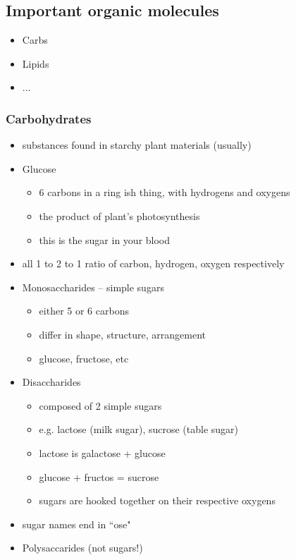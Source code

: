 \documentclass{article}
\theoremstyle{definition}
\begin{document}
\subsection{Important organic molecules}
\begin{itemize}
	\item Carbs
	\item Lipids
	\item ...
\end{itemize}

\subsubsection{Carbohydrates}
\begin{itemize}
	\item substances found in starchy plant materials (usually)
	\item Glucose
		\begin{itemize}
			\item 6 carbons in a ring ish thing, with hydrogens and oxygens
			\item the product of plant's photosynthesis
			\item this is the sugar in your blood
		\end{itemize}
	\item all 1 to 2 to 1 ratio of carbon, hydrogen, oxygen respectively
	\item Monosaccharides -- simple sugars
		\begin{itemize}
			\item either 5 or 6 carbons
			\item differ in shape, structure, arrangement
			\item glucose, fructose, etc
		\end{itemize}
	\item Disaccharides
		\begin{itemize}
			\item composed of 2 simple sugars
			\item e.g. lactose (milk sugar), sucrose (table sugar)
			\item lactose is galactose + glucose
			\item glucose + fructos = sucrose
			\item sugars are hooked together on their respective oxygens
		\end{itemize}
	\item sugar names end in ``ose"
	\item Polysaccarides (not sugars!)
		\begin{itemize}

\end{itemize}
\end{itemize}
\end{document}
